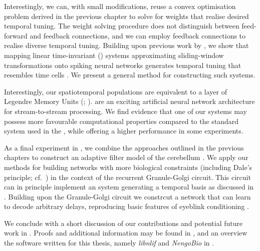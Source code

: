 Interestingly, we can, with small modifications, reuse a convex optimisation problem derived in the previous chapter to solve for weights that realise desired temporal tuning.
The weight solving procedure does not distinguish between feed-forward and feedback connections, and we can employ feedback connections to realise diverse temporal tuning.
Building upon previous work by \citet{voelker2018improving}, we show that mapping linear time-invariant (\LTI) systems approximating sliding-window transformations onto spiking neural networks generates temporal tuning that resembles time cells \citep{pastalkova2008internally,howard2014unified,tiganj2016sequential}.
We present a general method for constructing such \LTI systems.

Interestingly, our spatiotemporal \NEF populations are equivalent to a layer of Legendre Memory Units (\LMUpl; \cite{voelker2019lmu}).
\LMUpl are an exciting artificial neural network architecture for stream-to-stream processing.
We find evidence that one of our \LTI systems may possess more favourable computational properties compared to the standard \LTI system used in the \LMU, while offering a higher performance in some experiments.

As a final experiment in , we combine the approaches outlined in the previous chapters to construct an adaptive filter model of the cerebellum \citep{fujita1982adaptive}.
We apply our methods for building \NEF networks with more biological constraints (including Dale's principle; cf.~) in the context of the recurrent Granule-Golgi circuit.
This circuit can in principle implement an \LTI system generating a temporal basis as discussed in .
Building upon the Granule-Golgi circuit we constrcut a network that can learn to decode arbitrary delays, reproducing basic features of eyeblink conditioning \citep[e.g.,][]{heiney2014cerebellardependent}.

We conclude with a short discussion of our contributions and potential future work in .
Proofs and additional information may be found in , and an overview the software written for this thesis, namely \emph{libnlif} and \emph{NengoBio} in .

